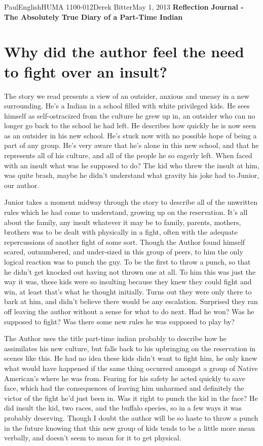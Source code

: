 \documentclass[12pt,letterpaper]{article}
\begin{document}
\begin{mla}{Paul}{English}{HUMA 1100-012}{Derek
    Bitter}{May 1, 2013}    
    {\textbf{Reflection Journal - The Absolutely True Diary of a Part-Time Indian}}

\section*{Why did the author feel the need to fight over an insult?}

The story we read presents a view of an outsider, anxious and uneasy in a new surrounding. He's a Indian in a school filled with white privileged kids. He sees himself as self-ostracized from the culture he grew up in, an outsider who can no longer go back to the school he had left. He describes how quickly he is now seen as an outsider in his new school. He's stuck now with no possible hope of being a part of any group. He's very aware that he's alone in this new school, and that he represents all of his culture, and all of the people he so eagerly left. When faced with an insult what was he supposed to do? The kid who threw the insult at him, was quite brash, maybe he didn't understand what gravity his joke had to Junior, our author. 

Junior takes a moment midway through the story to describe all of the unwritten rules which he had come to understand, growing up on the reservation. It's all about the family, any insult whatever it may be to family, parents, mothers, brothers was to be dealt with physically in a fight, often with the adequate repercussions of another fight of some sort. Though the Author found himself scared, outnumbered, and under-sized in this group of peers, to him the only logical reaction was to punch the guy. To be the first to throw a punch, so that he didn't get knocked out having not thrown one at all. To him this was just the way it was, these kids were so insulting because they knew they could fight and win, at least that's what he thought initially. Turns out they were only there to bark at him, and didn't believe there would be any escalation. Surprised they ran off leaving the author without a sense for what to do next. Had he won? Was he supposed to fight? Was there some new rules he was supposed to play by?

The Author uses the title part-time indian probably to describe how he assimilates his new culture, but falls back to his upbringing on the reservation in scenes like this. He had no idea these kids didn't want to fight him, he only knew what would have happened if the same thing occurred amongst a group of Native American's where he was from. Fearing for his safety he acted quickly to save face, which had the consequences of leaving him unharmed and definitely the victor of the fight he'd just been in. Was it right to punch the kid in the face? He did insult the kid, two races, and the buffalo species, so in a few ways it was probably deserving. Though I doubt the author will be so haste to throw a punch in the future knowing that this new group of kids tends to be a little more mean verbally, and doesn't seem to mean for it to get physical. 

\end{mla}
\end{document}
